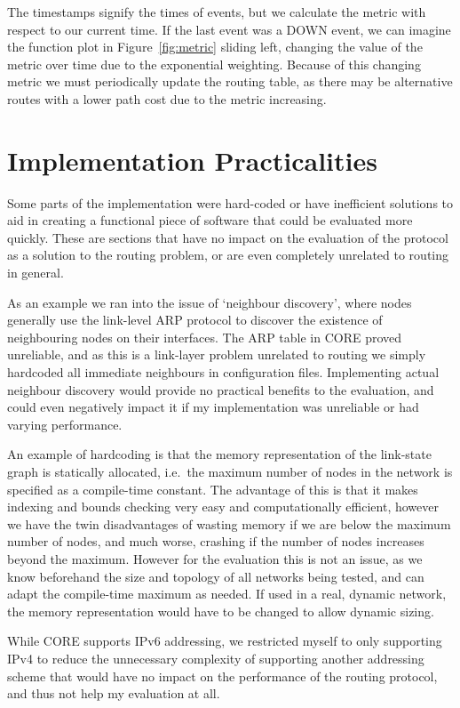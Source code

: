 \documentclass[withindex,glossary,openany]{cam-thesis}
\begin{document}
The timestamps signify the times of events, but we calculate the metric with respect to our current time. If the last event was a DOWN event, we can imagine the function plot in Figure~\ref{fig:metric} sliding left, changing the value of the metric over time due to the exponential weighting. Because of this changing metric we must periodically update the routing table, as there may be alternative routes with a lower path cost due to the metric increasing.

\section{Implementation Practicalities}

Some parts of the implementation were hard-coded or have inefficient solutions to aid in creating a functional piece of software that could be evaluated more quickly. These are sections that have no impact on the evaluation of the protocol as a solution to the routing problem, or are even completely unrelated to routing in general.

As an example we ran into the issue of `neighbour discovery', where nodes generally use the link-level ARP protocol to discover the existence of neighbouring nodes on their interfaces. The ARP table in CORE proved unreliable, and as this is a link-layer problem unrelated to routing we simply hardcoded all immediate neighbours in configuration files. Implementing actual neighbour discovery would provide no practical benefits to the evaluation, and could even negatively impact it if my implementation was unreliable or had varying performance.

An example of hardcoding is that the memory representation of the link-state graph is statically allocated, i.e.\ the maximum number of nodes in the network is specified as a compile-time constant. The advantage of this is that it makes indexing and bounds checking very easy and computationally efficient, however we have the twin disadvantages of wasting memory if we are below the maximum number of nodes, and much worse, crashing if the number of nodes increases beyond the maximum. However for the evaluation this is not an issue, as we know beforehand the size and topology of all networks being tested, and can adapt the compile-time maximum as needed. If used in a real, dynamic network, the memory representation would have to be changed to allow dynamic sizing.

While CORE supports IPv6 addressing, we restricted myself to only supporting IPv4 to reduce the unnecessary complexity of supporting another addressing scheme that would have no impact on the performance of the routing protocol, and thus not help my evaluation at all.
\end{document}

